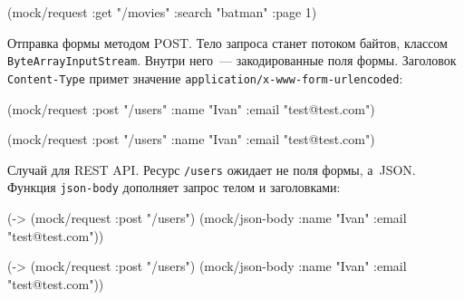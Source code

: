 \else

\begin{english}
  \begin{clojure}
(mock/request :get "/movies" {:search "batman" :page 1})
  \end{clojure}
\end{english}

\fi

\fi


\noindent
Отправка формы методом POST. Тело запроса станет потоком байтов, классом
\texttt{ByteArrayInputStream}. Внутри него~--- закодированные поля
формы. Заголовок \verb|Content-Type| примет значение
\verb|application/x-www-form-urlencoded|:

\ifnarrow

\begin{english}
  \begin{clojure}
(mock/request :post "/users"
  {:name "Ivan" :email "test@test.com"})
  \end{clojure}
\end{english}

\else

\begin{english}
  \begin{clojure}
(mock/request :post "/users"
              {:name "Ivan" :email "test@test.com"})
  \end{clojure}
\end{english}

\fi


\noindent
Случай для REST API. Ресурс \verb|/users| ожидает не поля формы, а~JSON.
Функция \verb|json-body| дополняет запрос телом и заголовками:

\ifnarrow

\begin{english}
  \begin{clojure}
(-> (mock/request :post "/users")
    (mock/json-body
      {:name "Ivan"
       :email "test@test.com"}))
  \end{clojure}
\end{english}

\else

\begin{english}
  \begin{clojure}
(-> (mock/request :post "/users")
    (mock/json-body
      {:name "Ivan" :email "test@test.com"}))
  \end{clojure}
\end{english}

